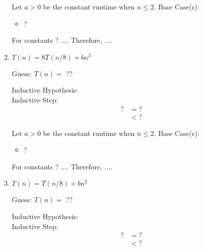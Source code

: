 \documentclass[11pt, letter]{article}
\begin{document}
\begin{enumerate}
    Let $a > 0$ be the constant runtime when $n\leq 2$. Base Case(s):
    \begin{itemize}
        \item ?
    \end{itemize}  
    
    For constants $?$ $...$. Therefore, $...$.\\
    
\item $T(n) = 8T(n/8) + bn^2$\\

    \begin{center}
        Guess: $T(n) = $ ??\\
    \end{center}
    
    Inductive Hypothesis: \\
    Inductive Step:\\
    \begin{equation*}
        \begin{split}
            ? &= ?\\
            &< ?
        \end{split}
    \end{equation*}
    
    Let $a > 0$ be the constant runtime when $n\leq 2$. Base Case(s):
    \begin{itemize}
        \item ?
    \end{itemize}  
    
    For constants $?$ $...$. Therefore, $...$.\\
    
\item $T(n) = T(n/8) + bn^2$\\

    \begin{center}
        Guess: $T(n) = $ ??\\
    \end{center}
    
    Inductive Hypothesis: \\
    Inductive Step:\\
    \begin{equation*}
        \begin{split}
            ? &= ?\\
            &< ?
        \end{split}
    \end{equation*}
    

\end{enumerate}
\end{document}
